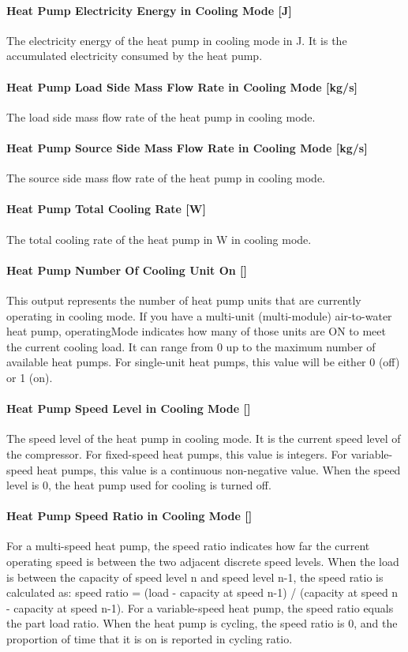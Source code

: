 \paragraph{Heat Pump Electricity Energy in Cooling Mode {[}J{]}} The electricity
energy of the heat pump in cooling mode in J. It is the accumulated electricity
consumed by the heat pump.
\paragraph{Heat Pump Load Side Mass Flow Rate in Cooling Mode {[}kg/s{]}} The
load side mass flow rate of the heat pump in cooling mode.
\paragraph{Heat Pump Source Side Mass Flow Rate in Cooling Mode {[}kg/s{]}} The
source side mass flow rate of the heat pump in cooling mode.
\paragraph{Heat Pump Total Cooling Rate {[}W{]}} The total cooling rate of the
heat pump in W in cooling mode.
\paragraph{Heat Pump Number Of Cooling Unit On {[}{]}}
This output represents the number of heat pump units that are currently operating
in cooling mode. If you have a multi-unit (multi-module) air-to-water heat pump,
operatingMode indicates how many of those units are ON to meet the current cooling load.
It can range from 0 up to the maximum number of available heat pumps. For single-unit heat pumps,
this value will be either 0 (off) or 1 (on).
\paragraph{Heat Pump Speed Level in Cooling Mode {[}{]}} The speed level of the
heat pump in cooling mode. It is the current speed level of the compressor. For
fixed-speed heat pumps, this value is integers. For variable-speed heat pumps,
this value is a continuous non-negative value. When the speed level is 0,
the heat pump used for cooling is turned off.
\paragraph{Heat Pump Speed Ratio in Cooling Mode {[}{]}} For a multi-speed heat pump, the speed ratio
indicates how far the current operating speed is between the two adjacent discrete speed levels.
When the load is between the capacity of speed level n and speed level n-1, the speed ratio is calculated as:
speed ratio = (load - capacity at speed n-1) / (capacity at speed n - capacity at speed n-1).
For a variable-speed heat pump, the speed ratio equals the part load ratio.
When the heat pump is cycling, the speed ratio is 0, and the proportion of time that it is on is reported in cycling ratio.
